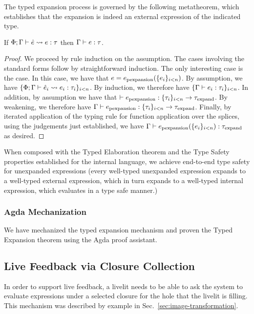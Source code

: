 The typed expansion process is governed by the following metatheorem, which establishes that the expansion 
is indeed an external expression of the indicated type.

\begin{theorem}
    If $\Phi; \Gamma \vdash \hat e \leadsto e : \tau$ then $\Gamma \vdash e : \tau$.
\end{theorem}
\begin{proof}
    We proceed by rule induction on the assumption. 
    The cases involving the standard forms follow by straightforward induction.
    The only interesting case is the  case.
    In this case, we have that $e = e_\text{pexpansion}(\{e_i\}_{i < n})$. 
    By assumption, we have $\{ \Phi; \Gamma \vdash \hat e_i \leadsto e_i : \tau_i \}_{i < n}$.
    By induction, we therefore have $\{ \Gamma \vdash e_i : \tau_i \}_{i < n}$.
    In addition, by assumption we have that $\vdash e_\text{pexpansion} : \{\tau_i\}_{i < n} \rightarrow \tau_\text{expand}$.
    By weakening, we therefore have $\Gamma \vdash e_\text{pexpansion} : \{\tau_i\}_{i < n} \rightarrow \tau_\text{expand}$.
    Finally, by iterated application of the typing rule for function application over the splices, 
    using the judgements just established, 
    we have $\Gamma \vdash e_\text{pexpansion}(\{e_i\}_{i < n}) : \tau_\text{expand}$ as desired.
\end{proof}

When composed with the Typed Elaboration theorem and the Type Safety properties established for the internal 
language, we achieve end-to-end type safety for unexpanded expressions (every well-typed unexpanded 
expression expands to a well-typed external expression, which in turn expands to a well-typed internal 
expression, which evaluates in a type safe manner.)

\subsubsection{Agda Mechanization}
We have mechanized the typed expansion mechanism and proven the Typed Expansion theorem 
using the Agda proof assistant.

\subsection{Live Feedback via Closure Collection}
In order to support live feedback, a livelit needs to be able to ask the system
to evaluate expressions under a selected closure for the hole that the livelit is filling.
This mechanism was described by example in Sec.~\ref{sec:image-transformation}.


